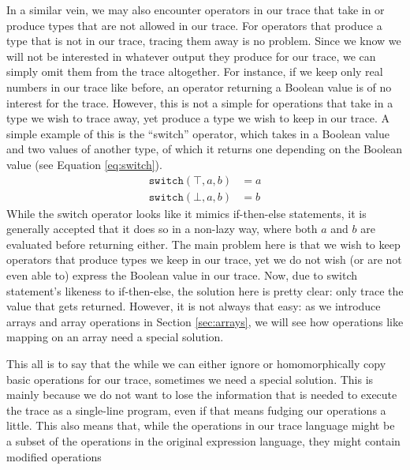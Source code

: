     In a similar vein, we may also encounter operators in our trace that take in or produce types that are not allowed in our trace.
    For operators that produce a type that is not in our trace, tracing them away is no problem.
    Since we know we will not be interested in whatever output they produce for our trace, we can simply omit them from the trace altogether.
    For instance, if we keep only real numbers in our trace like before, an operator returning a Boolean value is of no interest for the trace.
    However, this is not a simple for operations that take in a type we wish to trace away, yet produce a type we wish to keep in our trace.
    A simple example of this is the ``switch'' operator, which takes in a Boolean value and two values of another type, of which it returns one depending on the Boolean value (see Equation \ref{eq:switch}).
    \begin{equation}
        \begin{aligned}
            \texttt{switch}(\top,a,b)&=a\\
            \texttt{switch}(\bot,a,b)&=b
        \end{aligned}
        \label{eq:switch}
    \end{equation}
    While the switch operator looks like it mimics if-then-else statements, it is generally accepted that it does so in a non-lazy way\cn, where both $a$ and $b$ are evaluated before returning either.
    The main problem here is that we wish to keep operators that produce types we keep in our trace, yet we do not wish (or are not even able to) express the Boolean value in our trace.
    Now, due to switch statement's likeness to if-then-else, the solution here is pretty clear: only trace the value that gets returned.
    However, it is not always that easy: as we introduce arrays and array operations in Section \ref{sec:arrays}, we will see how operations like mapping on an array need a special solution.
    
    This all is to say that the while we can either ignore or homomorphically copy basic operations for our trace, sometimes we need a special solution.
    This is mainly because we do not want to lose the information that is needed to execute the trace as a single-line program, even if that means fudging our operations a little.
    This also means that, while the operations in our trace language might be a subset of the operations in the original expression language, they might contain modified operations

